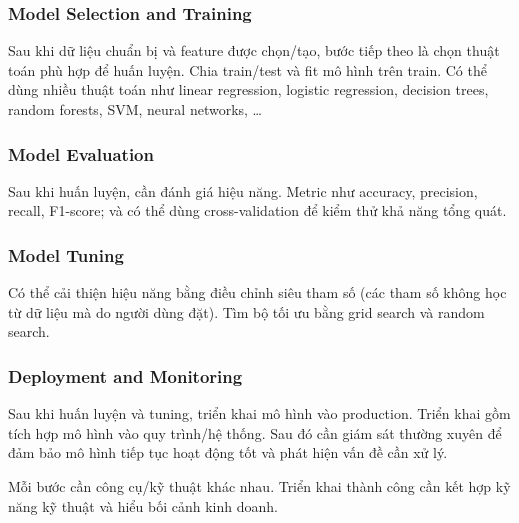 \subsubsection{Model Selection and Training}
\begin{phuongphap}[title={Chọn mô hình và huấn luyện}]
Sau khi dữ liệu chuẩn bị và feature được chọn/tạo, bước tiếp theo là chọn thuật toán phù hợp để huấn luyện.
Chia train/test và fit mô hình trên train.
Có thể dùng nhiều thuật toán như linear regression, logistic regression, decision trees, random forests, SVM, neural networks, \ldots
\end{phuongphap}

\subsubsection{Model Evaluation}
\begin{phuongphap}[title={Đánh giá mô hình}]
Sau khi huấn luyện, cần đánh giá hiệu năng.
Metric như accuracy, precision, recall, F1-score; và có thể dùng cross-validation để kiểm thử khả năng tổng quát.
\end{phuongphap}

\subsubsection{Model Tuning}
\begin{phuongphap}[title={Điều chỉnh siêu tham số}]
Có thể cải thiện hiệu năng bằng điều chỉnh siêu tham số (các tham số không học từ dữ liệu mà do người dùng đặt).
Tìm bộ tối ưu bằng grid search và random search.
\end{phuongphap}

\subsubsection{Deployment and Monitoring}
\begin{phuongphap}[title={Triển khai và giám sát}]
Sau khi huấn luyện và tuning, triển khai mô hình vào production.
Triển khai gồm tích hợp mô hình vào quy trình/hệ thống.
Sau đó cần giám sát thường xuyên để đảm bảo mô hình tiếp tục hoạt động tốt và phát hiện vấn đề cần xử lý.
\end{phuongphap}

\begin{luuy}[title={Kết luận}]
Mỗi bước cần công cụ/kỹ thuật khác nhau.
Triển khai thành công cần kết hợp kỹ năng kỹ thuật và hiểu bối cảnh kinh doanh.
\end{luuy}

